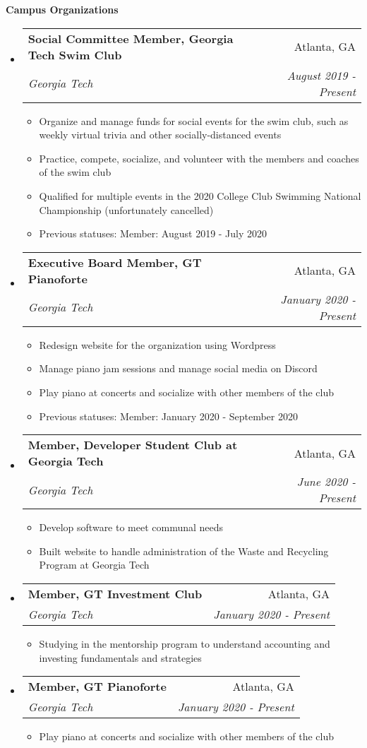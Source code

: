 \documentclass[letterpaper,11pt]{article}
\makeatletter
\newcommand{\resitem}[1]{\item #1 \vspace{-2pt}}
\newcommand{\resheading}[1]{{\large \colorbox{mygrey}{\begin{minipage}{\textwidth}{\textbf{#1 \vphantom{p\^{E}}}}\end{minipage}}}}
\newcommand{\ressubheading}[4]{
\begin{tabular*}{7.0in}{l@{\extracolsep{\fill}}r}
		\textbf{#1} & #2 \\
		\textit{#3} & \textit{#4} \\
\end{tabular*}\vspace{-6pt}}
\makeatother
\begin{document}
\resheading{Campus Organizations}
\begin{itemize}
\item
    \ressubheading{Social Committee Member, Georgia Tech Swim Club}{Atlanta, GA}{Georgia Tech}{August 2019 - Present}
    \begin{itemize}
        \resitem{Organize and manage funds for social events for the swim club, such as weekly virtual trivia and other socially-distanced events}
        \resitem{Practice, compete, socialize, and volunteer with the members and coaches of the swim club}
        \resitem{Qualified for multiple events in the 2020 College Club Swimming National Championship (unfortunately cancelled)}
        \resitem{Previous statuses: Member: August 2019 - July 2020}
    \end{itemize}
\item
    \ressubheading{Executive Board Member, GT Pianoforte}{Atlanta, GA}{Georgia Tech}{January 2020 - Present}
    \begin{itemize}
        \resitem{Redesign website for the organization using Wordpress}
        \resitem{Manage piano jam sessions and manage social media on Discord}
        \resitem{Play piano at concerts and socialize with other members of the club}
        \resitem{Previous statuses: Member: January 2020 - September 2020}
    \end{itemize}
\item
    \ressubheading{Member, Developer Student Club at Georgia Tech}{Atlanta, GA}{Georgia Tech}{June 2020 - Present}
    \begin{itemize}
        \resitem{Develop software to meet communal needs}
        \resitem{Built website to handle administration of the Waste and Recycling Program at Georgia Tech}
    \end{itemize}
\item
    \ressubheading{Member, GT Investment Club}{Atlanta, GA}{Georgia Tech}{January 2020 - Present}
    \begin{itemize}
        \resitem{Studying in the mentorship program to understand accounting and investing fundamentals and strategies}
    \end{itemize}
\item
    \ressubheading{Member, GT Pianoforte}{Atlanta, GA}{Georgia Tech}{January 2020 - Present}
    \begin{itemize}
        \resitem{Play piano at concerts and socialize with other members of the club}
    \end{itemize}
\end{itemize}
\end{document}
